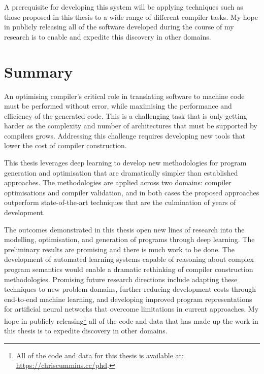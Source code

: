 A prerequisite for developing this system will be applying techniques such as those proposed in this thesis to a wide range of different compiler tasks. My hope in publicly releasing all of the software developed during the course of my research is to enable and expedite this discovery in other domains.


\section{Summary}
\label{sec:conclusions-summary}

An optimising compiler's critical role in translating software to machine code must be performed without error, while maximising the performance and efficiency of the generated code. This is a challenging task that is only getting harder as the complexity and number of architectures that must be supported by compilers grows. Addressing this challenge requires developing new tools that lower the cost of compiler construction.

This thesis leverages deep learning to develop new methodologies for program generation and optimisation that are dramatically simpler than  established approaches. The methodologies are applied across two domains: compiler optimisations and compiler validation, and in both cases the proposed approaches outperform state-of-the-art techniques that are the culmination of years of development.

The outcomes demonstrated in this thesis open new lines of research into the modelling, optimisation, and generation of programs through deep learning. The preliminary results are promising and there is much work to be done. The development of automated learning systems capable of reasoning about complex program semantics would enable a dramatic rethinking of compiler construction methodologies. Promising future research directions include adapting these techniques to new problem domains, further reducing development costs through end-to-end machine learning, and developing improved program representations for artificial neural networks that overcome limitations in current approaches. My hope in publicly releasing\footnote{All of the code and data for this thesis is available at: \url{https://chriscummins.cc/phd}.} all of the code and data that has made up the work in this thesis is to expedite discovery in other domains.
